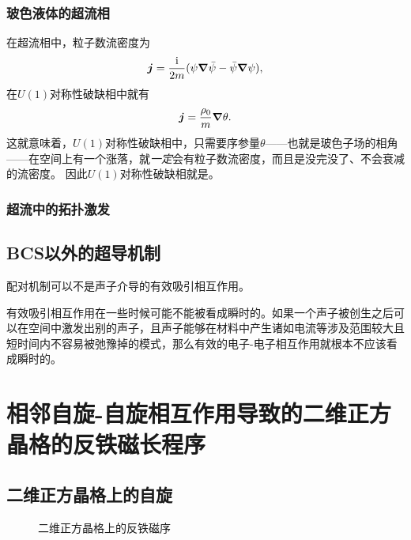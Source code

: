 \subsubsection{玻色液体的超流相}

在超流相中，粒子数流密度为
\[
    \vb*{j} = \frac{\mathrm{i}}{2m} ( \psi \grad{\bar{\psi}} - \bar{\psi} \grad{\psi} ),
\]
在$U(1)$对称性破缺相中就有
\begin{equation}
    \vb*{j} = \frac{\rho_0}{m} \grad{\theta}.
\end{equation}
这就意味着，$U(1)$对称性破缺相中，只需要序参量$\theta$——也就是玻色子场的相角——在空间上有一个涨落，就\emph{一定}会有粒子数流密度，而且是没完没了、不会衰减的流密度。
因此$U(1)$对称性破缺相就是。

\subsubsection{超流中的拓扑激发}

\subsection{BCS以外的超导机制}

配对机制可以不是声子介导的有效吸引相互作用。

有效吸引相互作用在一些时候可能不能被看成瞬时的。如果一个声子被创生之后可以在空间中激发出别的声子，且声子能够在材料中产生诸如电流等涉及范围较大且短时间内不容易被弛豫掉的模式，那么有效的电子-电子相互作用就根本不应该看成瞬时的。

\section{相邻自旋-自旋相互作用导致的二维正方晶格的反铁磁长程序}\label{sec:spin-spin-nn-interaction-sdw}

\subsection{二维正方晶格上的自旋}

\begin{figure}
    \centering
    \subfigure[自旋密度波]{
              
    }
    \subfigure[SDW形成后的两条子格子]{
        
    }
    \caption{二维正方晶格上的反铁磁序}
\end{figure}

